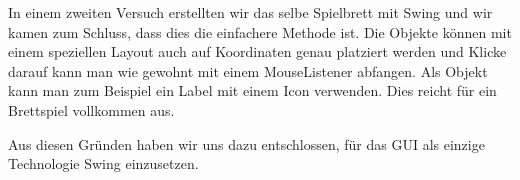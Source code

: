 \documentclass[a4paper,12pt,halfparskip,DIV12]{scrartcl}
\begin{document}
In einem zweiten Versuch erstellten wir das selbe Spielbrett mit Swing und wir kamen zum Schluss, dass dies die einfachere Methode ist. Die Objekte können mit einem speziellen Layout auch auf Koordinaten genau platziert werden und Klicke darauf kann man wie gewohnt mit einem MouseListener abfangen. Als Objekt kann man zum Beispiel ein Label mit einem Icon verwenden. Dies reicht für ein Brettspiel vollkommen aus.

Aus diesen Gründen haben wir uns dazu entschlossen, für das GUI als einzige Technologie Swing einzusetzen.


\end{document}
